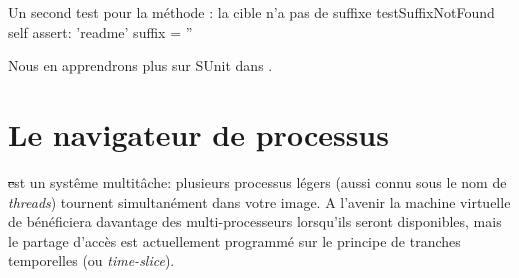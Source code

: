 \documentclass[a4paper,10pt,twoside]{book}
\begin{document}
\begin{method}[testNoSuffix]{Un second test pour la méthode : la cible n'a pas de suffixe}
testSuffixNotFound
	self assert: 'readme' suffix = ''
\end{method}


Nous en apprendrons plus sur SUnit dans .


\section{Le navigateur de processus}

\st est un systême multitâche: plusieurs processus légers (aussi
connu sous le nom de \emph{threads}) tournent simultanément dans
votre image.
A l'avenir la machine virtuelle de \pharo bénéficiera davantage
des multi-processeurs lorsqu'ils seront disponibles, mais le partage
d'accès est actuellement programmé sur le principe de 
tranches temporelles (ou \emph{time-slice}).
\end{document}
